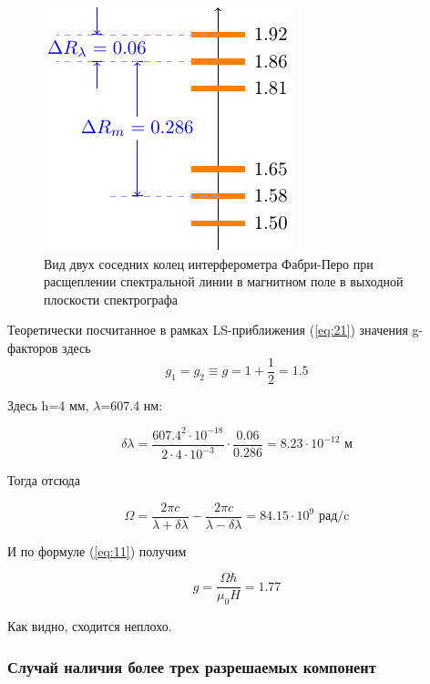 \begin{figure}[H]
	\centering
	\includegraphics[scale=1]{ris/3b}
	\caption{Вид двух соседних колец интерферометра Фабри-Перо при расщеплении спектральной линии в магнитном поле в выходной плоскости спектрографа}
	\label{fig:ris3b}
\end{figure}

Теоретически посчитанное в рамках LS-приближения (\ref{eq:21}) значения  g-факторов здесь
\begin{equation}
	g_1=g_2\equiv g=1+\frac12=1.5
\end{equation}

Здесь h=4 мм,  $\lambda$=607.4 нм:

\begin{equation}
 	\delta \lambda=\frac{607.4^2\cdot10^{-18}}{2\cdot4\cdot10^{-3}}\cdot\frac{0.06}{0.286}=8.23\cdot10^{-12} \text{ м}
 \end{equation} 

Тогда отсюда

\begin{equation}
	\Omega=\frac{2\pi c}{\lambda+\delta \lambda}-\frac{2\pi c}{\lambda-\delta \lambda}=84.15\cdot10^{9} \text{ рад/c}
\end{equation}

И по формуле (\ref{eq:11}) получим

\begin{equation}
	g=\frac{\Omega \hbar}{\mu_0 H}=1.77
\end{equation}

Как видно, сходится неплохо.

\subsubsection{Случай наличия более трех разрешаемых компонент}

